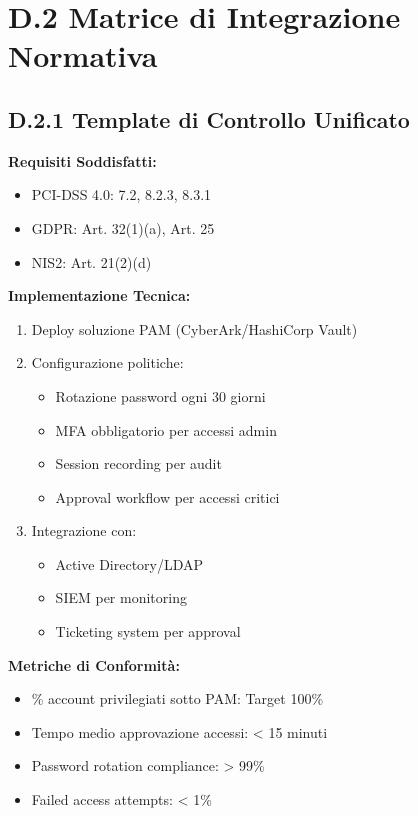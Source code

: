 \section{\texorpdfstring{\textbf{D.2 Matrice di Integrazione Normativa}}{D.2 - Matrice di Integrazione Normativa}}

\subsection{\texorpdfstring{\textbf{D.2.1 Template di Controllo Unificato}}{D.2.1 - Template di Controllo Unificato}}

\begin{tcolorbox}[
    colback=blue!5!white,
    colframe=blue!75!black,
    title={\textbf{Controllo Unificato CU-001: Gestione Accessi Privilegiati}},
    fonttitle=\bfseries,
    boxrule=1.5pt,
    arc=2mm,
    breakable
]
\textbf{Requisiti Soddisfatti:}
\begin{itemize}
    \item PCI-DSS 4.0: 7.2, 8.2.3, 8.3.1
    \item GDPR: Art. 32(1)(a), Art. 25
    \item NIS2: Art. 21(2)(d)
\end{itemize}

\textbf{Implementazione Tecnica:}
\begin{enumerate}
    \item Deploy soluzione PAM (CyberArk/HashiCorp Vault)
    \item Configurazione politiche:
    \begin{itemize}
        \item Rotazione password ogni 30 giorni
        \item MFA obbligatorio per accessi admin
        \item Session recording per audit
        \item Approval workflow per accessi critici
    \end{itemize}
    \item Integrazione con:
    \begin{itemize}
        \item Active Directory/LDAP
        \item SIEM per monitoring
        \item Ticketing system per approval
    \end{itemize}
\end{enumerate}

\textbf{Metriche di Conformità:}
\begin{itemize}
    \item \% account privilegiati sotto PAM: Target 100\%
    \item Tempo medio approvazione accessi: < 15 minuti
    \item Password rotation compliance: > 99\%
    \item Failed access attempts: < 1\%
\end{itemize}


\end{tcolorbox}
